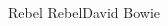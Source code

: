 \begin{Song}{Rebel Rebel}{David Bowie}
\begin{multicols}{2}
\gridGroupNormal

\begin{Chords}
\hline
\\\hline
\end{Chords}
\espaceInterGrille


\begin{Chords}
\hline
\\\hline
\end{Chords}

\end{multicols}

\vfill

\end{Song}


